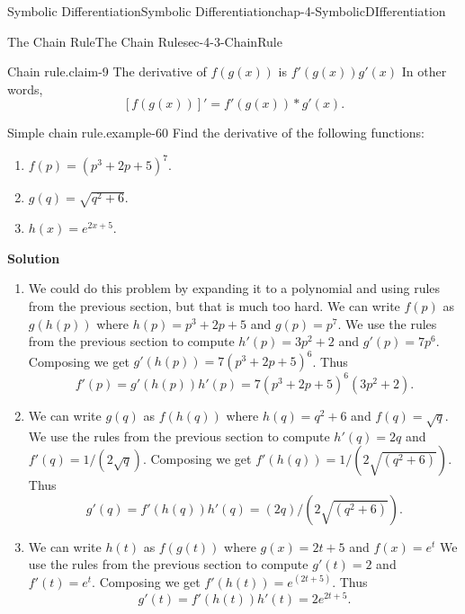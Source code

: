 \documentclass[oneside,10pt,]{book}
\newcommand{\terminology}[1]{\textbf{#1}}
\numberwithin{equation}{section}
\begin{document}
\begin{chapterptx}{Symbolic Differentiation}{}{Symbolic Differentiation}{}{}{chap-4-SymbolicDIfferentiation}
\begin{sectionptx}{The Chain Rule}{}{The Chain Rule}{}{}{sec-4-3-ChainRule}
\begin{claim}{Chain rule.}{}{claim-9}
\hypertarget{p-1628}{}%
The derivative of \(f(g(x))\) is \(f'(g(x))g'(x)\)   In other words,%
\begin{equation*}
\left[f(g(x))\right]'=f'(g(x))*g'(x)\text{.}
\end{equation*}
%
\end{claim}
\begin{example}{Simple chain rule.}{example-60}%
\hypertarget{p-1629}{}%
Find the derivative of the following functions:%
\leavevmode%
\begin{enumerate}[label=(\alph*)]
\item\hypertarget{li-497}{}\(f(p)=(p^3+2 p+5)^7.\)%
\item\hypertarget{li-498}{}\(g(q)=\sqrt{q^2+6}.\)%
\item\hypertarget{li-499}{}\(h(x)=e^{2 x+5}.\)%
\end{enumerate}
\hypertarget{p-1630}{}%
\terminology{Solution}%
\leavevmode%
\begin{enumerate}[label=(\alph*)]
\item\hypertarget{li-500}{}\hypertarget{p-1631}{}%
We could do this problem by expanding it to a polynomial and using rules from the previous section, but that is much too hard.  We can write \(f(p)\) as \(g(h(p))\) where \(h(p)=p^3+2 p+5\) and \(g(p)=p^7\).  We use the rules from the previous section to compute \(h'(p)=3 p^2+2\) and \(g'(p)=7p^6\).  Composing we get \(g'(h(p))=7(p^3+2 p+5)^6\).  Thus%
%
\begin{equation*}
f'(p)=g'(h(p))h'(p)=7(p^3+2 p+5)^6(3 p^2+2 ).
\end{equation*}
\item\hypertarget{li-501}{}\hypertarget{p-1632}{}%
We can write \(g(q)\) as \(f(h(q))\) where \(h(q)=q^2+6\) and \(f(q)=\sqrt{q}\).  We use the rules from the previous section to compute \(h'(q)=2 q\) and \(f'(q)= 1/(2\sqrt{q})\). Composing we get \(f'(h(q))= 1/(2\sqrt{(q^2+6 )})\).  Thus%
%
\begin{equation*}
g'(q)=f'(h(q)) h'(q)=(2 q)/(2\sqrt{(q^2+6 )}).
\end{equation*}
\item\hypertarget{li-502}{}\hypertarget{p-1633}{}%
We can write \(h(t)\) as \(f(g(t))\) where \(g(x)=2 t+5\) and \(f(x)=e^t\)  We use the rules from the previous section to compute \(g'(t)=2\)  and \(f'(t)=e^t\).  Composing we get \(f' (h(t))=   e^(2 t+5)\).  Thus%
%
\begin{equation*}
g'(t)=f'(h(t)) h' (t)= 2 e^{2 t+5}.
\end{equation*}
\end{enumerate}

\end{example}
\end{sectionptx}
\end{chapterptx}
\end{document}
